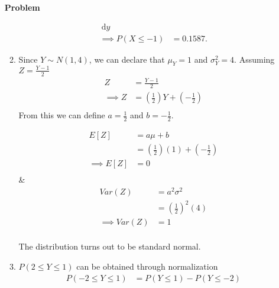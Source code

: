 \documentclass[12pt]{article}
\newenvironment{Ex}{\textbf{Problem}\vspace{.75em}\\}{}
\newcommand{\dd}[1]{\:\mathrm{d}{#1}}
\begin{document}
\begin{enumerate}
\begin{Ex}
\begin{solution}
\begin{enumerate}
\begin{multicols}{2}
\begin{equation}
\begin{aligned}
              \dd{y} \\
              \implies P(X \le -1 )&= 0.1587.
            \end{aligned}
          \end{equation}
        \end{multicols}
      \item Since $Y \sim N(1,4)$, we can declare that $\mu_Y = 1$ and
        $\sigma^2_Y = 4$. Assuming $Z = \frac{Y-1}{2}$
        \begin{equation}
          \label{eq:2b-z}
          \begin{aligned}
            Z &= \frac{Y-1}{2} \\
            \implies Z &= \left(\frac{1}{2}\right)Y + \left(-\frac{1}{2}\right) \\
          \end{aligned}
        \end{equation}
        From this we can define $a = \frac{1}{2}$ and $b = -\frac{1}{2}$.
        \begin{multicols}{2}
          \begin{equation}
            \label{eq:2b-e-sol}
            \begin{aligned}
              E[Z] &= a\mu + b \\
              &= \left(\frac{1}{2}\right)(1) + \left(-\frac{1}{2}\right) \\
              \implies E[Z] &= 0\\
            \end{aligned}
          \end{equation} &
          \begin{equation}
            \label{eq:2b-var-sol}
            \begin{aligned}
              Var(Z)&=a^2\sigma^2 \\
              &=\left(\frac{1}{2}\right)^2(4) \\
              \implies Var(Z)&=1 \\
            \end{aligned}
          \end{equation}
        \end{multicols}
        The distribution turns out to be standard normal.
      \item $P(2 \le Y \le 1)$ can be obtained through normalization
        \begin{equation}
          \label{eq:2c-sol}
          \begin{aligned}
            P(-2 \le Y \le 1) &= P(Y \le 1) - P(Y \le -2) \\

\end{aligned}
\end{equation}
\end{enumerate}
\end{solution}
\end{Ex}
\end{enumerate}
\end{document}
